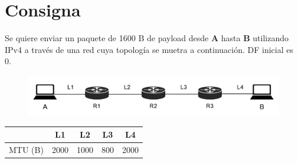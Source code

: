 \section*{Consigna}

Se quiere enviar un paquete de 1600 B de payload desde \textbf{A} hasta \textbf{B} utilizando IPv4 a través de una red cuya topología se muetra a continuación. DF inicial es 0.

\begin{figure}[H]
    \centering
    \includegraphics[width=0.9\linewidth]{Images/topologia.png}
\end{figure}

\vspace{-5mm}
{
\renewcommand{\arraystretch}{1.5}
\begin{table}[H]
    \centering
    \begin{tabular}{|c|c|c|c|c|}
    \hline
     & L1 & L2 & L3 & L4 \\ \hline
    MTU (B) & 2000 & 1000 & 800 & 2000\\ \hline
    \end{tabular}
\end{table}
}


